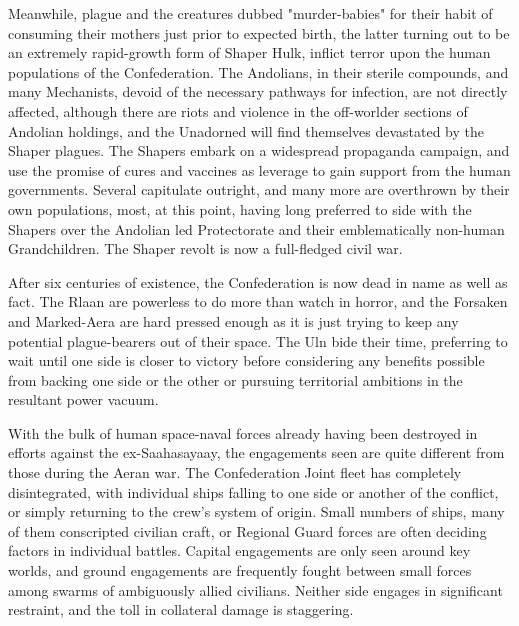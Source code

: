 Meanwhile, plague and the creatures dubbed "murder-babies" for their
habit of consuming their mothers just prior to expected birth, the
latter turning out to be an extremely rapid-growth form of Shaper
Hulk, inflict terror upon the human populations of the
Confederation. The Andolians, in their sterile compounds, and many
Mechanists, devoid of the necessary pathways for infection, are not
directly affected, although there are riots and violence in the
off-worlder sections of Andolian holdings, and the Unadorned will find
themselves devastated by the Shaper plagues. The Shapers embark on a
widespread propaganda campaign, and use the promise of cures and
vaccines as leverage to gain support from the human governments.
Several capitulate outright, and many more are overthrown by their own
populations, most, at this point, having long preferred to side with
the Shapers over the Andolian led Protectorate and their
emblematically non-human Grandchildren. The Shaper revolt is now a
full-fledged civil war.

After six centuries of existence, the Confederation is now dead in
name as well as fact. The Rlaan are powerless to do more than watch in
horror, and the Forsaken and Marked-Aera are hard pressed enough as it
is just trying to keep any potential plague-bearers out of their
space. The Uln bide their time, preferring to wait until one side is
closer to victory before considering any benefits possible from
backing one side or the other or pursuing territorial ambitions in the
resultant power vacuum.

With the bulk of human space-naval forces already having been
destroyed in efforts against the ex-Saahasayaay, the engagements seen
are quite different from those during the Aeran war. The Confederation
Joint fleet has completely disintegrated, with individual ships
falling to one side or another of the conflict, or simply returning to
the crew's system of origin. Small numbers of ships, many of them
conscripted civilian craft, or Regional Guard forces are often
deciding factors in individual battles. Capital engagements are only
seen around key worlds, and ground engagements are frequently fought
between small forces among swarms of ambiguously allied
civilians. Neither side engages in significant restraint, and the toll
in collateral damage is staggering.

